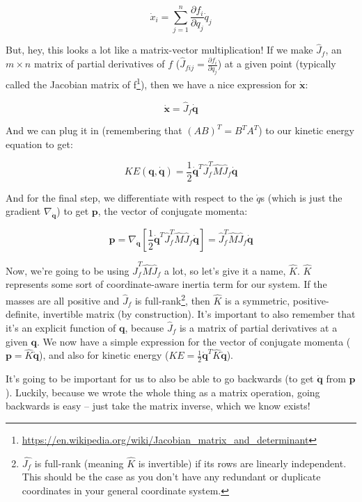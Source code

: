 \documentclass[]{article}
\renewcommand{\href}[2]{#2\footnote{\url{#1}}}
\begin{document}
\[
\dot{x}_i = \sum_{j = 1}^n \frac{\partial f_i}{\partial q_j} \dot{q}_j
\]

But, hey, this looks a lot like a matrix-vector multiplication! If we make
\(\hat{J}_f\), an \(m \times n\) matrix of partial derivatives of \(f\)
(\(\hat{J}_{fij} = \frac{\partial f_i}{\partial q_j}\)) at a given point
(typically called the
\href{https://en.wikipedia.org/wiki/Jacobian_matrix_and_determinant}{Jacobian
matrix of f}), then we have a nice expression for \(\dot{\mathbf{x}}\):

\[
\dot{\mathbf{x}} = \hat{J}_f \dot{\mathbf{q}}
\]

And we can plug it in (remembering that \((A B)^T = B^T A^T\)) to our kinetic
energy equation to get:

\[
KE(\mathbf{q},\dot{\mathbf{q}}) = \frac{1}{2} \dot{\mathbf{q}}^T \hat{J}_f^T
    \hat{M} \hat{J}_f \dot{\mathbf{q}}
\]

And for the final step, we differentiate with respect to the \(\dot{q}\)s (which
is just the gradient \(\nabla_{\dot{\mathbf{q}}}\)) to get \(\mathbf{p}\), the
vector of conjugate momenta:

\[
\mathbf{p} = \nabla_{\dot{\mathbf{q}}} \left[
    \frac{1}{2} \dot{\mathbf{q}}^T \hat{J}_f^T \hat{M} \hat{J}_f \dot{\mathbf{q}}
  \right]
  = \hat{J}_f^T \hat{M} \hat{J}_f \dot{\mathbf{q}}
\]

Now, we're going to be using \(\hat{J}_f^T \hat{M} \hat{J}_f\) a lot, so let's
give it a name, \(\hat{K}\). \(\hat{K}\) represents some sort of
coordinate-aware inertia term for our system. If the masses are all positive and
\(\hat{J}_f\) is full-rank\footnote{\(\hat{J_f}\) is full-rank (meaning
  \(\hat{K}\) is invertible) if its rows are linearly independent. This should
  be the case as you don't have any redundant or duplicate coordinates in your
  general coordinate system.}, then \(\hat{K}\) is a symmetric,
positive-definite, invertible matrix (by construction). It's important to also
remember that it's an explicit function of \(\mathbf{q}\), because \(\hat{J}_f\)
is a matrix of partial derivatives at a given \(\mathbf{q}\). We now have a
simple expression for the vector of conjugate momenta
(\(\mathbf{p} = \hat{K} \dot{\mathbf{q}}\)), and also for kinetic energy
(\(KE = \frac{1}{2} \dot{\mathbf{q}}^T \hat{K} \dot{\mathbf{q}}\)).

It's going to be important for us to also be able to go backwards (to get
\(\dot{\mathbf{q}}\) from \(\mathbf{p}\)). Luckily, because we wrote the whole
thing as a matrix operation, going backwards is easy -- just take the matrix
inverse, which we know exists!
\end{document}
